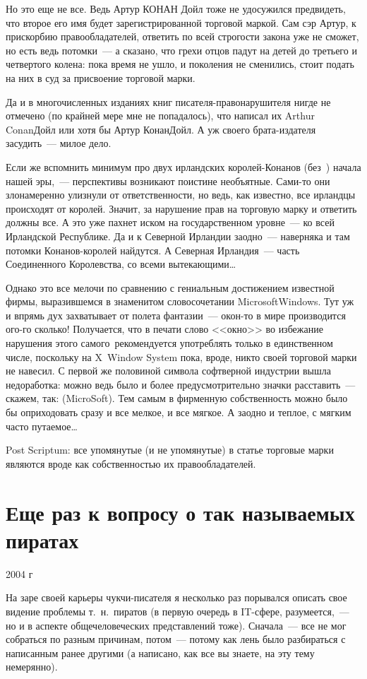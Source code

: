 Но это еще не все. Ведь Артур КОНАН Дойл тоже не удосужился предвидеть, что второе его имя будет зарегистрированной торговой маркой. Сам сэр Артур, к прискорбию правообладателей, ответить по всей строгости закона уже не сможет, но есть ведь потомки~--- а сказано, что грехи отцов падут на детей до третьего и четвертого колена: пока время не ушло, и поколения не сменились, стоит подать на них в суд за присвоение торговой марки.

Да и в многочисленных изданиях книг писателя-правонарушителя нигде не отмечено (по крайней мере мне не попадалось), что написал их Arthur Conan\texttrademark Дойл или хотя бы Артур Конан\texttrademark Дойл. А уж своего брата-издателя засудить~--- милое дело.

Если же вспомнить минимум про двух ирландских королей-Конанов (без~\texttrademark) начала нашей эры,~--- перспективы возникают поистине необъятные. Сами-то они злонамеренно улизнули от ответственности, но ведь, как известно, все ирландцы происходят от королей. Значит, за нарушение прав на торговую марку и ответить должны все. А это уже пахнет иском на государственном уровне~--- ко всей Ирландской Республике. Да и к Северной Ирландии заодно~--- наверняка и там потомки Конанов-королей найдутся. А Северная Ирландия~--- часть Соединенного Королевства, со всеми вытекающими\dots

Однако это все мелочи по сравнению с гениальным достижением известной фирмы, выразившемся в знаменитом словосочетании Microsoft\textregistered Windows\texttrademark. Тут уж и впрямь дух захватывает от полета фантазии~--- окон-то в мире производится ого-го сколько! Получается, что в печати слово <<окно>> во избежание нарушения этого самого~\texttrademark рекомендуется употреблять только в единственном числе, поскольку на X~Window System пока, вроде, никто своей торговой марки не навесил. С первой же половиной символа софтверной индустрии вышла недоработка: можно ведь было и более предусмотрительно значки расставить~--- скажем, так: (Micro{\textregistered}Soft\textregistered)\texttrademark. Тем самым в фирменную собственность можно было бы оприходовать сразу и все мелкое, и все мягкое. А заодно и теплое, с мягким часто путаемое\dots

Post Scriptum: все упомянутые (и не упомянутые) в статье торговые марки являются вроде как собственностью их правообладателей.

\section{Еще раз к вопросу о так называемых пиратах} 
\begin{timeline}2004 г\end{timeline}
На заре своей карьеры чукчи-писателя я несколько раз порывался описать свое видение проблемы т.~н.~пиратов (в первую очередь в IT-сфере, разумеется,~--- но и в аспекте общечеловеческих представлений тоже). Сначала~--- все не мог собраться по разным причинам, потом~--- потому как лень было разбираться с написанным ранее другими (а написано, как все вы знаете, на эту тему немерянно).

